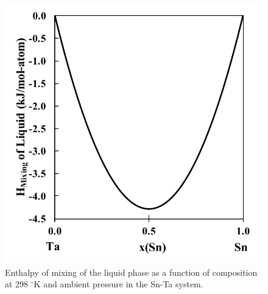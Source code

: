 \pagebreak
\begin{figure}[H]
	\centering
	\includegraphics{Chapter-4/Figures/HofMix.pdf}
	\caption{Enthalpy of mixing of the liquid phase as a function of composition at 298 $^\circ$K and ambient pressure in the Sn-Ta system.}
	\label{Ch4-figure:HofMix}
\end{figure}